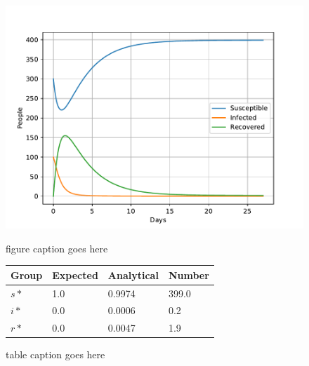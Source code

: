 \documentclass[a4paper]{article}
\begin{document}
\begin{figure}
	\centering
	\begin{minipage}{0.49\textwidth}
		\centering
		\includegraphics[scale=0.6]{../plots/opp_a_D.pdf}
		\caption{figure caption goes here}\label{fig:opp_a_D}
	\end{minipage}
	\begin{minipage}{0.49\textwidth}
		\centering
		\captionsetup{type=table} %
		\begin{tabular}{|l|l|l|l|}
			\hline
			Group & Expected & Analytical   & Number  \\ \hline
			$s*$ & 1.0 & 0.9974 & 399.0 \\ \hline
			$i*$ & 0.0 & 0.0006 & 0.2 \\ \hline
			$r*$ & 0.0 & 0.0047 & 1.9 \\ \hline
		\end{tabular}
		\caption{table caption goes  here}\label{tab:opp_a_D}
	\end{minipage}
\end{figure}
\end{document}
